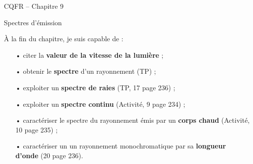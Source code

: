 \documentclass[12pt,a5paper]{article}
\begin{document}
\begin{header}
CQFR -- Chapitre 9

Spectres d'émission
\end{header}

À la fin du chapitre, je suis capable de :
\begin{itemize}
\item[•] citer la \textbf{valeur de la vitesse de la lumière} ;

\item[•] obtenir le \textbf{spectre} d'un rayonnement (TP) ;

\item[•] exploiter un \textbf{spectre de raies} (TP, 17 page 236) ;

\item[•] exploiter un \textbf{spectre continu} (Activité, 9 page 234) ;

\item[•] caractériser le spectre du rayonnement émis par un \textbf{corps chaud} (Activité, 10 page 235) ;

\item[•] caractériser un un rayonnement monochromatique par sa \textbf{longueur d'onde} (20 page 236).
\end{itemize}
\end{document}

